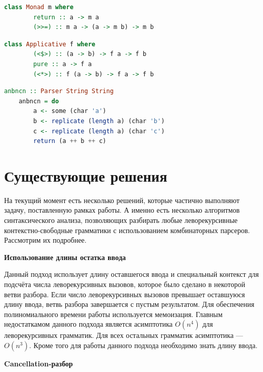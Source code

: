 \documentclass[times]{itmo-student-thesis}
\begin{document}
\begin{lstlisting}[language=Haskell,float=!h,caption={Класс монад в Haskell},label={lst:monad_typeclass}]
    class Monad m where
        return :: a -> m a
        (>>=) :: m a -> (a -> m b) -> m b
\end{lstlisting}

\begin{lstlisting}[language=Haskell,caption={Класс аппликативов в Haskell},label={lst:applicative_typeclass}]
    class Applicative f where
        (<$>) :: (a -> b) -> f a -> f b
        pure :: a -> f a
        (<*>) :: f (a -> b) -> f a -> f b
\end{lstlisting}

\begin{lstlisting}[language=Haskell,caption={Монадический парсер для не КС языка},label={lst:non_context_free}]
    anbncn :: Parser String String
    anbncn = do
        a <- some (char 'a')
        b <- replicate (length a) (char 'b')
        c <- replicate (length a) (char 'c')
        return (a ++ b ++ c)
\end{lstlisting}

\section{Существующие решения}\label{sec:existing_solutions}

На текущий момент есть несколько решений, которые частично выполняют задачу, поставленную рамках работы. А именно есть
несколько алгоритмов синтаксического анализа, позволяющих разбирать любые леворекурсивные контекстно-свободные грамматики с
использованием комбинаторных парсеров. Рассмотрим их подробнее.

\textbf{Использование длины остатка ввода}~\cite{hudak_parser_2008}

Данный подход использует длину оставшегося ввода и специальный контекст для подсчёта числа леворекурсивных вызовов, которое
было сделано в некоторой ветви разбора. Если число леворекурсивных вызовов превышает оставшуюся длину ввода, ветвь разбора
завершается с пустым результатом. Для обеспечения полиномиального времени работы используется мемоизация. Главным недостаткамом данного 
подхода является асимптотика $O(n^4)$ для леворекурсивных грамматик. Для всех остальных грамматик асимптотика --- $O(n^3)$. Кроме
того для работы данного подхода необходимо знать длину ввода.

\textbf{Cancellation-разбор}~\cite{nederhof_new_1993}
\end{document}
